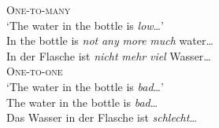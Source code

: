 \documentclass[output=paper]{LSP/langsci}
\begin{document}
\ea\label{schaeffer-carl:ex:1}
	\begin{xlist}
    
    	\ex \label{schaeffer-carl:ex:1a} 
        \glt \textsc{One-to-many}\\
        \glt `The water in the bottle is \textit{low}\ldots' \\
		\gll In the bottle is \textit{not} {\textit{any} \textit{more}} \textit{much} water\ldots\\
        		In der Flasche ist \textit{nicht} \textit{mehr} \textit{viel} Wasser\ldots \\ 
     		 
        
        
		\ex \label{schaeffer-carl:ex:1b}
        \glt \textsc{One-to-one}\\
        \glt  `The water in the bottle is \textit{bad}\ldots' \\
		\gll  The water in the bottle is \textit{bad}\ldots\\ 
        	Das Wasser in der Flasche ist \textit{schlecht}\ldots\\
			  
        
	\end{xlist}
\z
\end{document}
